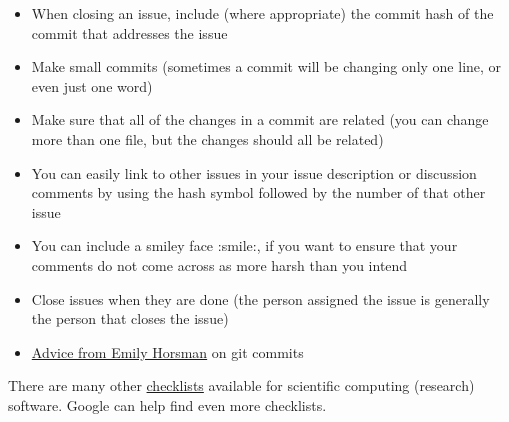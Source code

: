 \documentclass[12pt]{article}
\begin{document}
\begin{itemize}
\item When closing an issue, include (where appropriate) the commit hash of the
  commit that addresses the issue
\item Make small commits (sometimes a commit will be changing only one line, or
  even just one word)
\item Make sure that all of the changes in a commit are related (you can change
  more than one file, but the changes should all be related)
\item You can easily link to other issues in your issue description or
  discussion comments by using the hash symbol followed by the number
  of that other issue
\item You can include a smiley face :smile:, if you want to ensure that your
  comments do not come across as more harsh than you intend
\item Close issues when they are done (the person assigned the issue is
  generally the person that closes the issue)
\item 
  \href{https://gitlab.cas.mcmaster.ca/smiths/se2aa4_cs2me3/-/blob/master/FAQ/GitAdvice.txt}
  {Advice from Emily Horsman} on git commits
\end{itemize}

There are many other
\href{https://gitlab.cas.mcmaster.ca/SEforSC/se4sc/-/wikis/Advice-and-Checklists-for-Repos-(including-a-list-of-recommended-artifacts)}{checklists}
available for scientific computing (research) software.  Google can help find
even more checklists.
\end{document}
